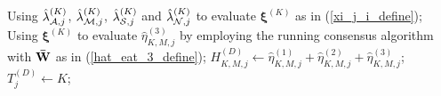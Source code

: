 \documentclass[11pt, draftclsnofoot, onecolumn]{IEEEtran}
\newcommand{\bxi}{{\boldsymbol{\xi}}}
\begin{document}
\begin{algorithm}[htb]
\begin{algorithmic}[1]
		\STATE Using $\hat \lambda _{{\cal A},j}^{(K)}$,  $\hat \lambda _{{\cal M},j}^{(K)}$, $\hat \lambda _{{\cal S},j}^{(K)}$ and $\hat \lambda _{{\cal N},j}^{(K)}$ to evaluate $\bxi^{(K)}$ as in (\ref{xi_j_i_define});
		\STATE Using $\bxi^{(K)}$ to evaluate ${\hat \eta _{K,M,j}^{(3)}}$ by employing the running consensus algorithm with ${\bf{\bar W}}$ as in (\ref{hat_eat_3_define});
		\STATE $H_{K,M,j}^{\left( D \right)} \leftarrow \hat \eta _{K,M,j}^{(1)} + \hat \eta _{K,M,j}^{(2)} + \hat \eta _{K,M,j}^{(3)}$;
		\STATE $T_j^{(D)} \leftarrow K$;
		\ENDWHILE
	\end{algorithmic}
	\label{Algorithm_DAGCUSUM}
\end{algorithm}

%
%
%
\end{document}
